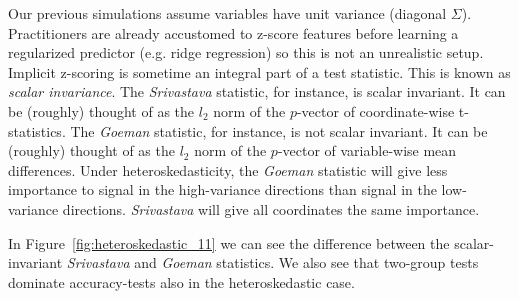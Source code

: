\documentclass[]{bio}
\begin{document}
Our previous simulations assume variables have unit variance (diagonal $\Sigma$). 
Practitioners are already accustomed to z-score features before learning a regularized predictor (e.g. ridge regression) so this is not an unrealistic setup.
Implicit z-scoring is sometime an integral part of a test statistic. 
This is known as \emph{scalar invariance}.
The \emph{Srivastava} statistic, for instance, is scalar invariant. 
It can be (roughly) thought of as the $l_2$ norm of the $p$-vector of coordinate-wise t-statistics.
The \emph{Goeman} statistic, for instance, is not scalar invariant. 
It can be (roughly) thought of as the $l_2$ norm of the $p$-vector of variable-wise mean differences.
Under heteroskedasticity, the \emph{Goeman} statistic will give less importance to signal in the high-variance directions than signal in the low-variance directions. 
\emph{Srivastava} will give all coordinates the same importance.

In Figure~\ref{fig:heteroskedastic_11} we can see the difference between the scalar-invariant \emph{Srivastava} and \emph{Goeman} statistics. 
We also see that two-group tests dominate accuracy-tests also in the heteroskedastic case. 
\end{document}
